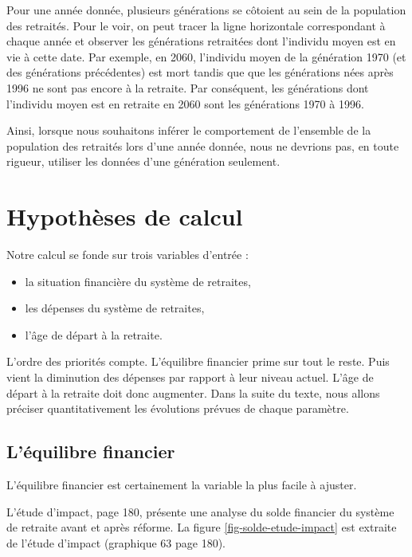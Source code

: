 \documentclass[10pt]{article}
\begin{document}
Pour une année donnée, plusieurs générations se côtoient au sein de la population des retraités. 
Pour le voir, on peut tracer la ligne horizontale correspondant à chaque année et observer les générations retraitées dont l'individu moyen est en vie à cette date. 
Par exemple, en 2060, l'individu moyen de la génération 1970 (et des générations précédentes) est mort tandis que que les générations nées après 1996 ne sont pas encore à la retraite. 
Par conséquent, les générations dont l'individu moyen est en retraite en 2060 sont les générations 1970 à 1996. 

Ainsi, lorsque nous souhaitons inférer le comportement de l'ensemble de la 
population des retraités lors d'une année donnée, nous ne devrions pas, en toute 
rigueur, utiliser les données d'une génération seulement. 


\section{Hypothèses de calcul}

Notre calcul se fonde sur trois variables d'entrée :
\begin{itemize}
\item la situation financière du système de retraites, 
\item les dépenses du système de retraites, 
\item l'âge de départ à la retraite. 
\end{itemize}

L'ordre des priorités compte. 
L'équilibre financier prime sur tout le reste. 
Puis vient la diminution des dépenses par rapport à leur niveau actuel. 
L'âge de départ à la retraite doit donc augmenter. 
Dans la suite du texte, nous allons préciser quantitativement 
les évolutions prévues de chaque paramètre. 


\subsection{L'équilibre financier}

L'équilibre financier est certainement la variable 
la plus facile à ajuster. 

L'étude d'impact, page 180, présente une analyse du solde financier du système de retraite 
avant et après réforme.
La figure \ref{fig-solde-etude-impact} est extraite de l'étude d'impact 
(graphique 63 page 180). 
\end{document}
